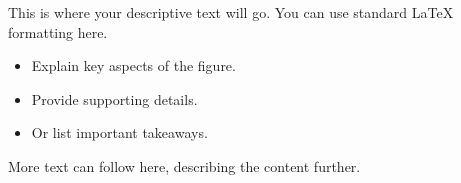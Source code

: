 \documentclass[12pt,notes]{beamer} %
\begin{document}
\begin{frame}
\begin{columns}[T]
			\begin{column}{0.50\textwidth} %
				This is where your descriptive text will go.
				You can use standard LaTeX formatting here.
				\begin{itemize}
					\item Explain key aspects of the figure.
					\item Provide supporting details.
					\item Or list important takeaways.
				\end{itemize}
				More text can follow here, describing the content further.
			\end{column}
			
		\end{columns}
	\end{frame}
	
\end{document}
